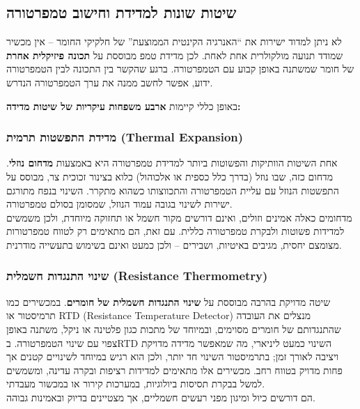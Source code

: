 \documentclass[
  hebrew,
  letterpaper,
  DIV=11,
  numbers=noendperiod]{scrreprt}
\begin{document}
\subsection{\texorpdfstring{{שיטות שונות למדידת וחישוב
טמפרטורה}}{שיטות שונות למדידת וחישוב טמפרטורה}}\label{ux5e9ux5d9ux5d8ux5d5ux5ea-ux5e9ux5d5ux5e0ux5d5ux5ea-ux5dcux5deux5d3ux5d9ux5d3ux5ea-ux5d5ux5d7ux5d9ux5e9ux5d5ux5d1-ux5d8ux5deux5e4ux5e8ux5d8ux5d5ux5e8ux5d4}

{לא ניתן למדוד ישירות את ``האנרגיה הקינטית הממוצעת'' של חלקיקי החומר --
אין מכשיר שמודד תנועה מולקולרית אחת לאחת}. {לכן מדידת
טמפ\textquotesingle{} מבוססת על \textbf{תכונה פיזיקלית אחרת} של חומר
שמשתנה באופן קבוע עם הטמפרטורה}. {ברגע שהקשר בין התכונה לבין הטמפרטורה
ידוע, אפשר לחשב ממנה את ערך הטמפרטורה הנדרש}.

{באופן כללי קיימות \textbf{ארבע משפחות עיקריות של שיטות
מדידה}}\textbf{:}

\subsubsection{\texorpdfstring{{מדידת התפשטות תרמית} (Thermal
Expansion)}{מדידת התפשטות תרמית (Thermal Expansion)}}\label{ux5deux5d3ux5d9ux5d3ux5ea-ux5d4ux5eaux5e4ux5e9ux5d8ux5d5ux5ea-ux5eaux5e8ux5deux5d9ux5ea-thermal-expansion}

{אחת השיטות הוותיקות והפשוטות ביותר למדידת טמפרטורה היא באמצעות
\textbf{מדחום נוזלי}}. {מדחום כזה, שבו נוזל (בדרך כלל כספית או אלכוהול)
כלוא בצינור זכוכית צר, מבוסס על התפשטות הנוזל עם עליית הטמפרטורה
והתכווצותו כשהוא מתקרר}. {השינוי בנפח מתורגם ישירות לשינוי בגובה עמוד
הנוזל, שמסומן בסולם טמפרטורה}.\\
{מדחומים כאלה אמינים וזולים, ואינם דורשים מקור חשמל או תחזוקה מיוחדת,
ולכן משמשים למדידות פשוטות ולבקרת טמפרטורה כללית}. {עם זאת, הם מתאימים
רק לטווח טמפרטורות מצומצם יחסית, מגיבים באיטיות, ושבירים -- ולכן כמעט
ואינם בשימוש בתעשייה מודרנית}.

\subsubsection{\texorpdfstring{{שינוי התנגדות חשמלית} (Resistance
Thermometry)}{שינוי התנגדות חשמלית (Resistance Thermometry)}}\label{ux5e9ux5d9ux5e0ux5d5ux5d9-ux5d4ux5eaux5e0ux5d2ux5d3ux5d5ux5ea-ux5d7ux5e9ux5deux5dcux5d9ux5ea-resistance-thermometry}

{שיטה מדויקת בהרבה מבוססת על \textbf{שינוי התנגדות חשמלית של חומרים}}.
{במכשירים כמו תרמיסטור או} RTD (Resistance Temperature Detector) {מנצלים
את העובדה שהתנגדותם של חומרים מסוימים, ובמיוחד של מתכות כגון פלטינה או
ניקל, משתנה באופן צפוי עם שינוי הטמפרטורה}. {ב}RTD {השינוי כמעט ליניארי,
מה שמאפשר מדידה מדויקת ויציבה לאורך זמן; בתרמיסטור השינוי חד יותר, ולכן
הוא רגיש במיוחד לשינויים קטנים אך פחות מדויק בטווח רחב}. {מכשירים אלו
מתאימים למדידות רציפות ובקרה עדינה, ומשמשים למשל בבקרת תסיסות ביולוגיות,
במערכות קירור או במכשור מעבדתי}.\\
{הם דורשים כיול ומיגון מפני רעשים חשמליים, אך מצטיינים בדיוק ובאמינות
גבוהה}.
\end{document}
